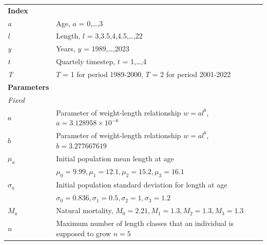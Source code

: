 \documentclass[review]{elsarticle}
\begin{document}
\begin{table}[h]

\centering

\small\small

\label{Symbols}

\renewcommand{\arraystretch}{0.8}

\begin{tabular}{|l|l l|}

\hline

\textbf{Index}   \\

\it a & Age, $ a $ = 0,\dots,3  \\

\it l & Length, $ l $ = 3,3.5,4,4.5,\dots,22  \\

\it y & Years, $ y $ = 1989,\dots,2023 \\

\it t & Quartely timestep, $ t $ = 1,\dots,4 \\

\it T & $T$ = 1 for period 1989-2000, $T$ = 2 for period 2001-2022 \\

\textbf{Parameters}    \\

\textit{Fixed} \\

$a$ &   Parameter of weight-length relationship $w=al^{b}$, $a=3.128958 \times 10^{-6}$ \\

$b$ &   Parameter of weight-length relationship $w=al^{b}$, $b = 3.277667619$   \\


$\mu_{a}$ & Initial population mean length at age \\
& $\mu_{0}=9.99,\mu_{1}=12.1, \mu_{2}=15.2, \mu_{3}=16.1$ \\
$\sigma_{a}$ & Initial population standard deviation for length at age \\
& $\sigma_{0}=0.836, \sigma_1=0.5,\sigma_2=1,\sigma_3=1.2$\\
$M_{a}$ & Natural mortality, $M_{0}=2.21, M_{1}=1.3, M_{2}=1.3,M_{3}=1.3$ \\
$n$ & Maximum number of length classes that an individual is supposed to grow $n=5$ \\


\end{tabular}
\end{table}
\end{document}
